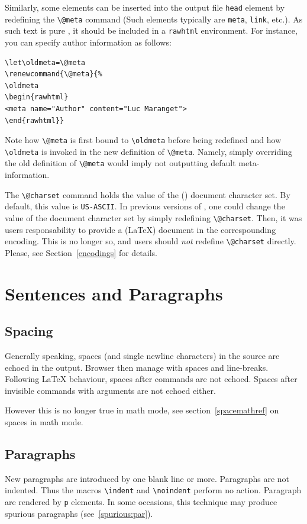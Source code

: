 \label{exlet}Similarly, some elements can be inserted into the output file
\verb+head+ element by redefining the \verb+\@meta+ command
(Such elements typically are \verb+meta+, \verb+link+, etc.).
As such text is pure \html{}, it should be included in a
\verb+rawhtml+ environment. For instance, you can specify
author information as follows:
\begin{verbatim}
\let\oldmeta=\@meta
\renewcommand{\@meta}{%
\oldmeta
\begin{rawhtml}
<meta name="Author" content="Luc Maranget">
\end{rawhtml}}
\end{verbatim}
Note how \verb+\@meta+ is first bound to
\verb+\oldmeta+ before being redefined and how \verb+\oldmeta+ is
invoked in the new definition of \verb+\@meta+.
Namely, simply overriding the old definition of \verb+\@meta+ would
imply not outputting default meta-information.

The \verb+\@charset+ command holds the value of the (\html) document character
set. By default, this value is \texttt{US-ASCII}.
In previous versions of \hevea{}, one could change the
value of the document character set by simply redefining
\verb+\@charset+. Then, it was users responsability to provide a
(\LaTeX) document in the correspounding encoding.
This is no longer so, and users should \emph{not} redefine
\verb+\@charset+ directly. Please, see Section~\ref{encodings} for details.


\section{Sentences and Paragraphs}

\subsection{Spacing}
Generally speaking, spaces (and single newline characters) in the
source are echoed in the output.  Browser then manage with spaces and
line-breaks.  Following \LaTeX{} behaviour, spaces after commands are
not echoed.  Spaces after invisible commands with arguments are not
echoed either.

However this is no longer true in math mode, see
section~\ref{spacemathref} on spaces in math mode.

\subsection{Paragraphs}
New paragraphs are introduced by one blank line or more.
Paragraphs are not indented. Thus the macros \verb+\indent+ and
\verb+\noindent+ perform no action.
Paragraph are rendered by \verb+p+ elements.
In some occasions, this technique may produce spurious paragraphs
(see~\ref{spurious:par}).

